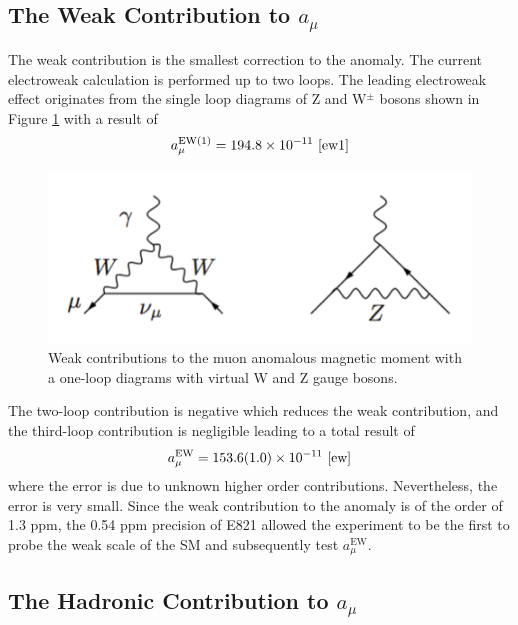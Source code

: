 \documentclass{outhesis}
\begin{document}
\subsection{The Weak Contribution to $a_{\mu}$}

The weak contribution is the smallest correction to the anomaly. The current electroweak calculation is performed up to two loops.
The leading electroweak effect originates from the single loop diagrams of Z and W$^{\pm}$ bosons shown in Figure \ref{fig:weak} with a result of 
\begin{equation}
a_{\mu}^{\text{EW(1)}} = 194.8 \times 10^{-11} \,\,\cite{ew1}
\end{equation}
\begin{figure}
  \centering
  \includegraphics[scale=0.5]{figures/wz}
   \caption{Weak contributions to the muon anomalous magnetic moment with a one-loop diagrams with virtual W and Z gauge bosons. }
  \label{fig:weak}
\end{figure}
The two-loop contribution is negative which reduces the weak contribution, and the third-loop contribution is negligible leading to a total result of 
\begin{equation}
a_{\mu}^{\text{EW}} = 153.6(1.0) \times 10^{-11} \,\,\cite{ew}
\label{eq:ew}
\end{equation}
where the error is due to unknown higher order contributions. Nevertheless, the error is very small.
Since the weak contribution to the anomaly is of the order of 1.3 ppm, the 0.54 ppm precision of E821 allowed the experiment to be the first to probe the weak scale of the SM and subsequently test $a_{\mu}^{\text{EW}}$. 

\subsection{The Hadronic Contribution to $a_{\mu}$}
\end{document}
